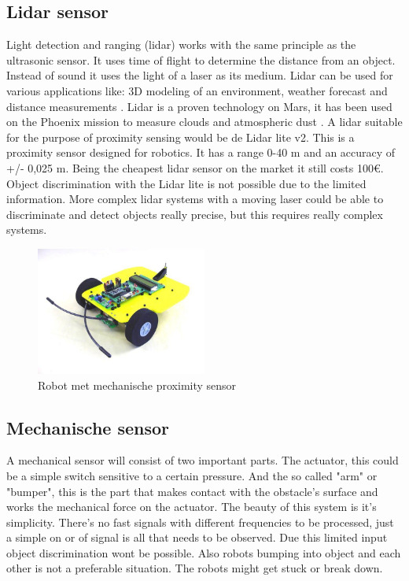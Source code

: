\documentclass[10pt,a4paper]{article}
\begin{document}
\subsection{Lidar sensor}
Light detection and ranging (lidar) works with the same principle as the ultrasonic sensor. It uses time of flight to determine the distance from an object. Instead of sound it uses the light of a laser as its medium. Lidar can be used for various applications like: 3D modeling of an environment, weather forecast and distance measurements \cite{whatlidar}. Lidar is a proven technology on Mars, it has been used on the Phoenix mission to measure clouds and atmospheric dust \cite{lidarmars}. A lidar suitable for the purpose of proximity sensing would be de Lidar lite v2. This is a proximity sensor designed for robotics. It has a range 0-40 m and an accuracy of +/- 0,025 m. Being the cheapest lidar sensor on the market it still costs 100\euro. Object discrimination with the Lidar lite is not possible due to the limited information. More complex lidar systems with a moving laser could be able to discriminate and detect objects really precise, but this requires really complex systems.


\begin{figure}[!ht]

  \centering
      \includegraphics[width=0.5\textwidth]{voelsprieten.jpg}
  \caption{Robot met mechanische proximity sensor}  \label{voelspriet}
 
\end{figure}

\subsection{Mechanische sensor}
A mechanical sensor will consist of two important parts. The actuator, this could be a simple switch sensitive to a certain pressure. And the so called "arm" or "bumper", this is the part that makes contact with the obstacle's surface and works the mechanical force on the actuator. The beauty of this system is it's simplicity. There's no fast signals with different frequencies to be processed, just a simple on or of signal is all that needs to be observed. Due this limited input object discrimination wont be possible. Also robots bumping into object and each other is not a preferable situation. The robots might get stuck or break down.
\end{document}
